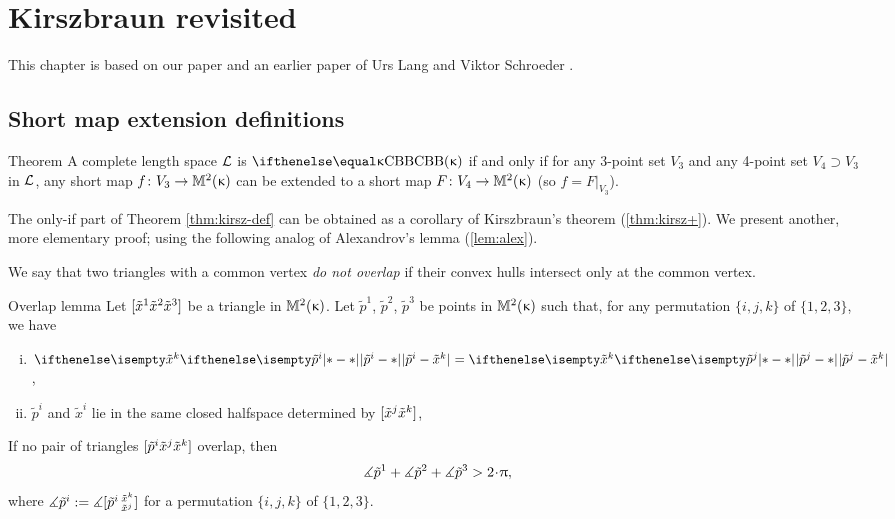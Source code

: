 \chapter{Kirszbraun revisited}

This chapter is based on our paper \cite{alexander-kapovitch-kirszbraun}
and an earlier paper of Urs Lang and Viktor Schroeder
\cite{lang-schroeder}.


\section{Short map extension definitions}\label{sec:4pt}

\begin{thm}{Theorem}\label{thm:kirsz-def} 
A complete length space
$\mathcal{L}$ is $\Alex\kappa$ if and only if for any 3-point set $V_3$ and any 4-point set $V_4\supset V_3$ in $\mathcal{L}$, 
any short map $f\:V_3\to\Lob2\kappa$ can be extended to a short map $F\:V_4\to\Lob2\kappa$ (so $f=F|_{V_3}$).
\end{thm}

The only-if part of Theorem \ref{thm:kirsz-def} can be obtained as a corollary of Kirszbraun's theorem (\ref{thm:kirsz+}).
We present another, more elementary proof; using the following analog of Alexandrov's lemma (\ref{lem:alex}).

We say that two triangles with a common vertex \emph{do not overlap} if their convex hulls intersect only at the common vertex.


\begin{thm}{Overlap lemma}\label{lem:extend-overlap}
Let $[{\tilde x^1}{\tilde x^2}{\tilde x^3}]$ be a triangle in $\mathbb{M}_{{}}^{2}({\upkappa})$.
Let $\tilde p^1$, $\tilde p^2$, $\tilde p^3$ be points in $\mathbb{M}_{{}}^{2}({\upkappa})$ such that, for any permutation $\{i,j,k\}$ of $\{1,2,3\}$, we have
\begin{enumerate}[(i)]

\item 
\label{no-overlap:px=px}
$\dist{\tilde p^i}{\tilde x^\kay}{}=\dist{\tilde p^j}{\tilde x^\kay}{}$,

\item
\label{no-overlap:orient-1}
$\tilde p^i$ and $\tilde x^i$ lie in the same closed halfspace determined by $[\tilde x^j\tilde x^k]$, 
\end{enumerate}

If no pair of triangles $[{\tilde p^i}{\tilde x^j}{\tilde x^k}]$ overlap,
then 
\[\mangle{\tilde p^1} +\mangle {\tilde p^2}+\mangle{\tilde p^3}> 2\cdot\pi,\]
where $\measuredangle\tilde p^i:=\measuredangle[\tilde p^i\,{}^{\tilde x^k}_{\tilde x^j}]$
for a permutation $\{i,j,k\}$ of $\{1,2,3\}$.
\end{thm}

